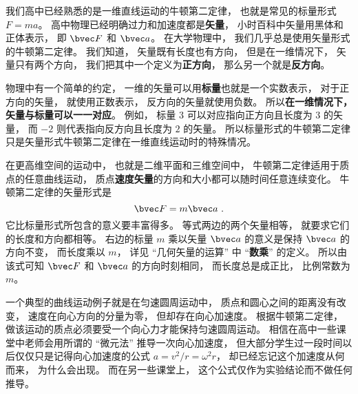 
\begin{issues}
\issueTODO
\end{issues}


我们高中已经熟悉的是一维直线运动的牛顿第二定律， 也就是常见的标量形式 $F = ma$。 高中物理已经明确过力和加速度都是\textbf{矢量}， 小时百科中矢量用黑体和正体表示， 即 $\bvec F$ 和 $\bvec a$。 在大学物理中， 我们几乎总是使用矢量形式的牛顿第二定律。 我们知道， 矢量既有长度也有方向， 但是在一维情况下， 矢量只有两个方向， 我们把其中一个定义为\textbf{正方向}， 那么另一个就是\textbf{反方向}。

物理中有一个简单的约定， 一维的矢量可以用\textbf{标量}也就是一个实数表示， 对于正方向的矢量， 就使用正数表示， 反方向的矢量就使用负数。 所以\textbf{在一维情况下， 矢量与标量可以一一对应}。 例如， 标量 $3$ 可以对应指向正方向且长度为 $3$ 的矢量， 而 $-2$ 则代表指向反方向且长度为 $2$ 的矢量。 所以标量形式的牛顿第二定律只是矢量形式牛顿第二定律在一维直线运动时的特殊情况。

在更高维空间的运动中， 也就是二维平面和三维空间中， 牛顿第二定律适用于质点的任意曲线运动， 质点\textbf{速度矢量}的方向和大小都可以随时间任意连续变化。 牛顿第二定律的矢量形式是
\begin{equation}
\bvec F = m\bvec a~.
\end{equation}
它比标量形式所包含的意义要丰富得多。 等式两边的两个矢量相等， 就要求它们的长度和方向都相等。 右边的标量 $m$ 乘以矢量 $\bvec a$ 的意义是保持 $\bvec a$ 的方向不变， 而长度乘以 $m$， 详见 “几何矢量的运算” 中 “\textbf{数乘}” 的定义。 所以由该式可知 $\bvec F$ 和 $\bvec a$ 的方向时刻相同， 而长度总是成正比， 比例常数为 $m$。

一个典型的曲线运动例子就是在匀速圆周运动中， 质点和圆心之间的距离没有改变， 速度在向心方向的分量为零， 但却存在向心加速度。 根据牛顿第二定律， 做该运动的质点必须要受一个向心力才能保持匀速圆周运动。 相信在高中一些课堂中老师会用所谓的 “微元法” 推导一次向心加速度， 但大部分学生过一段时间以后仅仅只是记得向心加速度的公式 $a = v^2/r = \omega^2 r$， 却已经忘记这个加速度从何而来， 为什么会出现。 而在另一些课堂上， 这个公式仅作为实验结论而不做任何推导。


